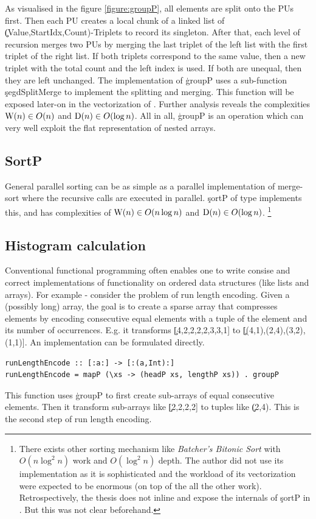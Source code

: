     As visualised in the figure \ref{figure:groupP},
    all elements are split onto the PUs first.
    Then each PU creates a local chunk of a linked list of
    \c{(Value,StartIdx,Count)}-Triplets to record its singleton.
    After that, each level of recursion merges two PUs by
    merging the last triplet of the left list with the first triplet
    of the right list. If both triplets correspond to the same value,
    then a new triplet with the total count and the left index is used.
    If both are unequal, then they are left unchanged. The implementation
    of \c{groupP} uses a sub-function \c{segdSplitMerge} to implement the
    splitting and merging. This function will be exposed later-on in
    the vectorization of \ndpn.
    Further analysis reveals the complexities $\textrm{W}(n) \in O(n)$ and $\textrm{D}(n) \in O(\log n)$.
    All in all, \c{groupP} is an operation which can very well exploit the flat representation of nested arrays.
    
  \subsection{SortP}
    General parallel sorting can be as simple as a parallel
    implementation of merge-sort where the recursive calls are executed
    in parallel. \c{sortP} of type \type{[:Int:] -> [:Int:]} implements this,
    and has complexities of $\textrm{W}(n) \in O(n \log n)$
    and $\textrm{D}(n) \in O(\log n)$.
    \footnote{There exists other sorting mechanism
    like \emph{Batcher's Bitonic Sort} with $O(n \log^2 n)$ work and $O(\log^2 n)$
    depth. The author did not use its implementation as it is sophisticated and
    the workload of its vectorization were expected to be enormous (on top of the all the other work).
    Retrospectively, the thesis does not inline and expose the internals of \c{sortP} in \ndpv.
    But this was not clear beforehand.
    }

  \subsection{Histogram calculation}
    Conventional functional programming often enables one to write
    consise and correct implementations of functionality on ordered
    data structures (like lists and arrays). For example -
    consider the problem of run length encoding. Given a (possibly long) array,
    the goal is to create a sparse array that compresses elements
    by encoding consecutive equal elements
    with a tuple of the element and its number of occurrences.
    E.g. it transforms \c{[4,2,2,2,2,3,3,1]} to \c{[(4,1),(2,4),(3,2),(1,1)]}.
    An implementation can be formulated directly.
    \begin{lstlisting}
runLengthEncode :: [:a:] -> [:(a,Int):]
runLengthEncode = mapP (\xs -> (headP xs, lengthP xs)) . groupP
    \end{lstlisting}
    This function uses \c{groupP} to first create sub-arrays of
    equal consecutive elements. Then it
    transform sub-arrays like \c{[2,2,2,2]} to tuples like \c{(2,4)}.
    This is the second step of run length encoding.
    
